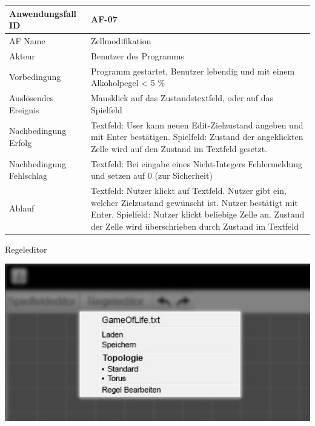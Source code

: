 \documentclass[11pt]{article}
\begin{document}
\begin{tabular}[m]{|m{7cm}|m{9cm}|}
    \hline
    Anwendungsfall ID     & AF-07 \\
         \hline
    AF Name     & Zellmodifikation \\
         \hline
    Akteur&Benutzer des Programms \\
    \hline
    Vorbedingung&Programm gestartet, Benutzer lebendig und mit einem Alkoholpegel < 5 \% \\
    \hline
    Auslösendes Ereignis&Mausklick auf das Zustandstextfeld, oder auf das Spielfeld\\
    \hline
    Nachbedingung Erfolg& Textfeld: User kann neuen Edit-Zielzustand angeben und mit Enter bestätigen. Spielfeld: Zustand der angeklickten Zelle wird auf den Zustand im Textfeld gesetzt. \\
    \hline
    Nachbedingung Fehlschlag&Textfeld: Bei eingabe eines Nicht-Integers Fehlermeldung und setzen auf 0 (zur Sicherheit)\\
    \hline
    Ablauf&Textfeld: Nutzer klickt auf Textfeld. Nutzer gibt ein, welcher Zielzustand gewünscht ist. Nutzer bestätigt mit Enter. 
    Spielfeld: Nutzer klickt beliebige Zelle an. Zustand der Zelle wird überschrieben durch Zustand im Textfeld\\
    \hline
\end{tabular}
\par

\pagebreak

    Regeleditor %

\par
\includegraphics[width=15cm]{regeleditor_dropdown_edit} %
\end{document}
